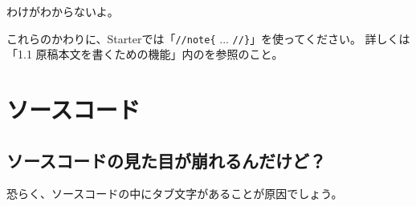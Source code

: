 \starterresult
\begin{reviewminicolumn}
\end{reviewminicolumn}
\endstarterresult
{}
\begin{starterprogram}\end{starterprogram}
\noindent
{}

\starterresult
\begin{reviewminicolumn}
\end{reviewminicolumn}
\endstarterresult
{}
\begin{starterprogram}\end{starterprogram}
\noindent
{}

\starterresult
\begin{reviewminicolumn}
\end{reviewminicolumn}
\endstarterresult
{}
\begin{starterprogram}\end{starterprogram}
\noindent
{}

\starterresult
\begin{reviewminicolumn}
\end{reviewminicolumn}
\endstarterresult

わけがわからないよ。

これらのかわりに、Starterでは「\texttt{//note\{} ... \texttt{//\}}」を使ってください。
詳しくは「1.1 原稿本文を書くための機能」内のを参照のこと。

\section{ソースコード}
\label{sec:2-4}

\subsection*{ソースコードの見た目が崩れるんだけど？}
\label{sec:2-4-1}

恐らく、ソースコードの中にタブ文字があることが原因でしょう。

